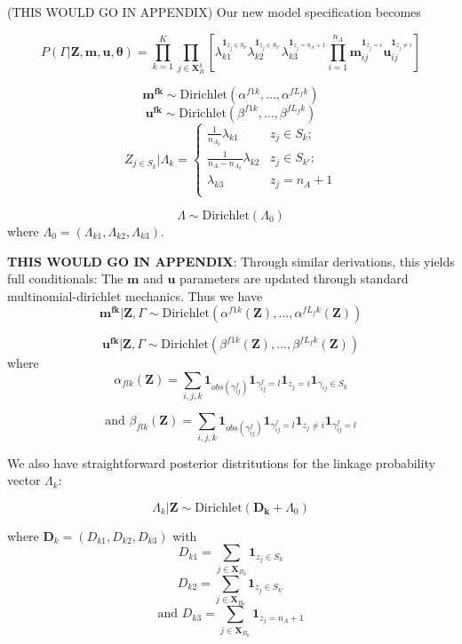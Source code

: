 \documentclass[
  12pt,
]{article}
\begin{document}
(THIS WOULD GO IN APPENDIX) Our new model specification becomes

\[P(\Gamma|\mathbf{Z}, \mathbf{m}, \mathbf{u}, \boldsymbol{\theta}) =\prod_{k=1}^K \prod_{j \in \mathbf{X}_B^k}  \left[\lambda_{k1}^{\mathbf{1}_{z_j \in S_k}}\lambda_{k2}^{\mathbf{1}_{z_j \in S_{k'}}} \lambda_{k3}^{\mathbf{1}_{z_j = n_A + 1}}\prod_{i=1}^{n_A}\mathbf{m}_{ij}^{\mathbf{1}_{z_j = i}}\mathbf{u}_{ij}^{\mathbf{1}_{z_j \neq i}}\right]\]

\[\mathbf{m^{fk}} \sim \text{Dirichlet}(\alpha^{f1k}, \ldots, \alpha^{fL_fk})\]
\[\mathbf{u^{fk}} \sim \text{Dirichlet}(\beta^{f1k}, \ldots, \beta^{fL_fk})\]
\[Z_{j \in S_k} | \Lambda_k =
\begin{cases} 
    \frac{1}{n_{A_k}}\lambda_{k1}  & z_j \in S_k; \\
    \frac{1}{n_A - n_{A_k}}\lambda_{k2}  & z_j \in S_{k'}; \\
     \lambda_{k3} & z_j = n_A + 1 \\
\end{cases}\]

\[\Lambda \sim \text{Dirichlet}(\Lambda_0)\] where
\(\Lambda_0 = (\Lambda_{k1}, \Lambda_{k2}, \Lambda_{k3}).\)

\textbf{THIS WOULD GO IN APPENDIX}: Through similar derivations, this
yields full conditionals: The \(\mathbf{m}\) and \(\mathbf{u}\)
parameters are updated through standard multinomial-dirichlet mechanics.
Thus we have
\[\mathbf{m^{fk}}|\mathbf{Z}, \Gamma \sim \text{Dirichlet}(\alpha^{f1k}(\mathbf{Z}), \ldots, \alpha^{fL_fk}(\mathbf{Z}))\]

\[\mathbf{u^{fk}}|\mathbf{Z}, \Gamma \sim \text{Dirichlet}(\beta^{f1k}(\mathbf{Z}), \ldots, \beta^{fL_fk}(\mathbf{Z}))\]
where
\[\alpha_{flk}(\mathbf{Z})= \sum_{i,j, k} \mathbf{1}_{obs(\gamma_{ij}^f)}\mathbf{1}_{\gamma_{ij}^f = l} \mathbf{1}_{z_j = i}\mathbf{1}_{\gamma_{ij} \in S_k}\]

\[\text{and } \beta_{flk}(\mathbf{Z})= \sum_{i,j, k} \mathbf{1}_{obs(\gamma_{ij}^f)}\mathbf{1}_{\gamma_{ij}^f = l} \mathbf{1}_{z_j \neq i}\mathbf{1}_{\gamma_{ij}^f = l}\]

We also have straightforward posterior distritutions for the linkage
probability vector \(\Lambda_k\):

\[\Lambda_k | \mathbf{Z} \sim \text{Dirichlet}(\mathbf{D_k} + \Lambda_0)\]

where \(\mathbf{D}_k = (D_{k1}, D_{k2}, D_{k3})\) with
\[D_{k1} = \sum_{j \in \mathbf{X}_{B_k}} \mathbf{1}_{z_j \in S_k}\]
\[D_{k2} = \sum_{j \in \mathbf{X}_{B_k}} \mathbf{1}_{z_j \in S_{k'}}\]
\[\text{and } D_{k3} = \sum_{j \in \mathbf{X}_{B_k}} \mathbf{1}_{z_j = n_A + 1}\]
\end{document}
